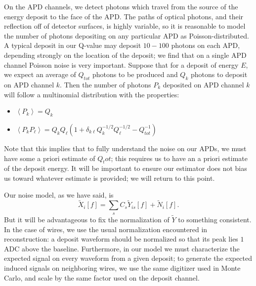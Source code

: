 On the APD channels, we detect photons which travel from the source of the energy deposit to the face of the APD.  The paths of optical photons, and their reflection off of detector surfaces, is highly variable, so it is reasonable to model the number of photons depositing on any particular APD as Poisson-distributed.  A typical deposit in our Q-value may deposit $10-100$ photons on each APD, depending strongly on the location of the deposit; we find that on a single APD channel Poisson noise is very important.  Suppose that for a deposit of energy $E$, we expect an average of $Q_{tot}$ photons to be produced and $Q_k$ photons to deposit on APD channel $k$.  Then the number of photons $P_k$ deposited on APD channel $k$ will follow a multinomial distribution with the properties:
\begin{itemize}
\item $\left< P_k \right> = Q_k$
\item $\left< P_k P_{\ell} \right> = Q_k Q_{\ell} \left( 1 + \delta_{k\ell}Q_k^{-1/2}Q_{\ell}^{-1/2} - Q_{tot}^{-1}\right)$
\end{itemize}

Note that this implies that to fully understand the noise on our APDs, we must have some a priori estimate of $Q_tot$; this requires us to have an a priori estimate of the deposit energy.  It will be important to ensure our estimator does not bias us toward whatever estimate is provided; we will return to this point.

Our noise model, as we have said, is \[\widetilde{X}_i[f] = \sum_s C_s\widetilde{Y}_{is}[f] + \widetilde{N}_i[f].\]  But it will be advantageous to fix the normalization of $\widetilde{Y}$ to something consistent.  In the case of wires, we use the usual normalization encountered in reconstruction: a deposit waveform should be normalized so that its peak lies $1$ ADC above the baseline.  Furthermore, in our model we must characterize the expected signal on every waveform from a given deposit; to generate the expected induced signals on neighboring wires, we use the same digitizer used in Monte Carlo, and scale by the same factor used on the deposit channel.

